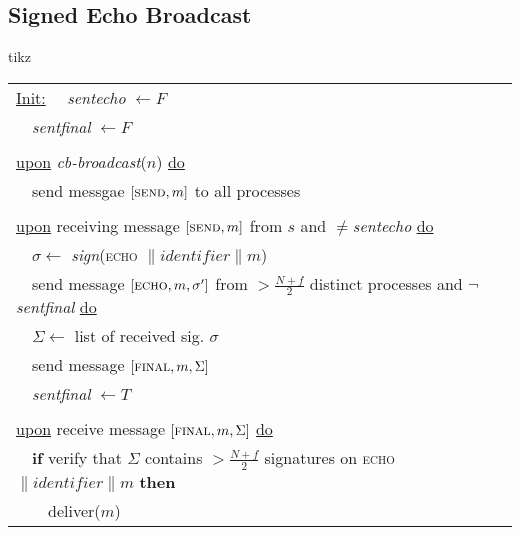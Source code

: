 \documentclass{article}
\begin{document}
\begin{adjustwidth}{2em}{2em}
		\subsection{Signed Echo Broadcast}
		\begin{center}
			tikz
		\end{center}
		\begin{adjustwidth}{2em}{2em}
			\begin{tabular}{l}
				\underline{Init:}
				\ \ \textit{sentecho} $\leftarrow F$ \\
				\ \ \textit{sentfinal} $\leftarrow F$ \\
				\\
				\underline{upon} \textit{cb-broadcast}($n$) \underline{do} \\
				\ \ send messgae $[\textsc{send}, m]$ to all processes \\
				\\
				\underline{upon} receiving message $[\textsc{send}, m]$ from $s$ and $\neq$\textit{sentecho} \underline{do} \\
				\ \ $\sigma \leftarrow$ \textit{sign}(\textsc{echo} $\| \textit{identifier} \| m$) \\
				\ \ send message $[\textsc{echo}, m, \sigma ']$ from $> \frac{N+f}{2}$ distinct processes and $\neg$\textit{sentfinal} \underline{do} \\
				\ \ $\Sigma \leftarrow$ list of received sig. $\sigma$ \\
				\ \ send message $[\textsc{final}, m, \Sigma]$ \\
				\ \ \textit{sentfinal} $\leftarrow T$ \\
				\\
				\underline{upon} receive message $[\textsc{final}, m, \Sigma]$ \underline{do} \\
				\ \ \textbf{if} verify that $\Sigma$ contains $> \frac{N+f}{2}$ signatures on \textsc{echo} $\| \textit{identifier} \| m$ \textbf{then} \\
				\ \ \ \ deliver($m$)
			\end{tabular}

\end{adjustwidth}
\end{adjustwidth}
\end{document}
